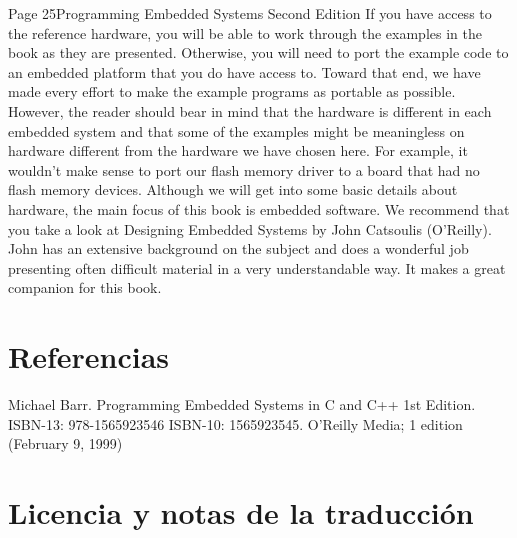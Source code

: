 \documentclass[output=paper, 
colorlinks,
citecolor=brown,
newtxmath
]{langscibook}
\begin{document}
Page 25Programming Embedded Systems Second Edition
If you have access to the reference hardware, you will be able to work through the examples in the book
as they are presented. Otherwise, you will need to port the example code to an embedded platform that
you do have access to. Toward that end, we have made every effort to make the example programs as
portable as possible. However, the reader should bear in mind that the hardware is different in each
embedded system and that some of the examples might be meaningless on hardware different from the
hardware we have chosen here. For example, it wouldn't make sense to port our flash memory driver to a
board that had no flash memory devices.
Although we will get into some basic details about hardware, the main focus of this book is embedded
software. We recommend that you take a look at Designing Embedded Systems by John Catsoulis
(O'Reilly). John has an extensive background on the subject and does a wonderful job presenting often
difficult material in a very understandable way. It makes a great companion for this book.




\pagebreak

\section{Referencias}

Michael Barr. Programming Embedded Systems in C and C++ 1st Edition. ISBN-13: 978-1565923546
ISBN-10: 1565923545. O'Reilly Media; 1 edition (February 9, 1999)


\section*{Licencia y notas de la traducción}
\end{document}
